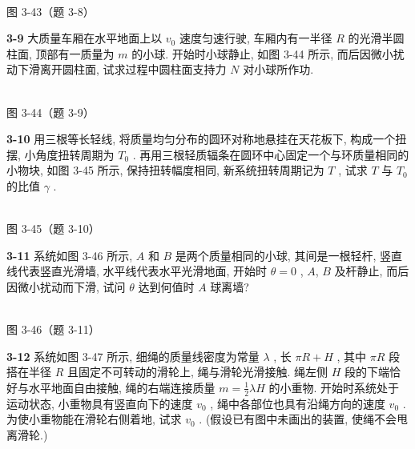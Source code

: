 \begin{center}
\resizebox{0.34\textwidth}{!}{}\\[4pt]
{\small 图 3-43（题 3-8）}
\end{center}

\newpage

\textbf{3-9} 大质量车厢在水平地面上以 $v_{0}$ 速度匀速行驶, 车厢内有一半径 $R$ 的光滑半圆柱面, 顶部有一质量为 $m$ 的小球. 开始时小球静止, 如图 3-44 所示, 而后因微小扰动下滑离开圆柱面, 试求过程中圆柱面支持力 $N$ 对小球所作功.

\begin{center}
\resizebox{0.50\textwidth}{!}{}\\[4pt]
{\small 图 3-44（题 3-9）}
\end{center}

\newpage

\textbf{3-10} 用三根等长轻线, 将质量均匀分布的圆环对称地悬挂在天花板下, 构成一个扭摆, 小角度扭转周期为 $T_{0}$ . 再用三根轻质辐条在圆环中心固定一个与环质量相同的小物块, 如图 3-45 所示, 保持扭转幅度相同, 新系统扭转周期记为 $T$ , 试求 $T$ 与 $T_{0}$ 的比值 $\gamma$ .

\begin{center}
\resizebox{0.32\textwidth}{!}{}\\[4pt]
{\small 图 3-45（题 3-10）}
\end{center}

\newpage

\textbf{3-11} 系统如图 3-46 所示, $A$ 和 $B$ 是两个质量相同的小球, 其间是一根轻杆, 竖直线代表竖直光滑墙, 水平线代表水平光滑地面, 开始时 $\theta = 0$ , $A$, $B$ 及杆静止, 而后因微小扰动而下滑, 试问 $\theta$ 达到何值时 $A$ 球离墙?

\begin{center}
\resizebox{0.37\textwidth}{!}{}\\[4pt]
{\small 图 3-46（题 3-11）}
\end{center}

\newpage

\textbf{3-12} 系统如图 3-47 所示, 细绳的质量线密度为常量 $\lambda$ , 长 $\pi R + H$ , 其中 $\pi R$ 段搭在半径 $R$ 且固定不可转动的滑轮上, 绳与滑轮光滑接触. 绳左侧 $H$ 段的下端恰好与水平地面自由接触, 绳的右端连接质量 $m = \frac{1}{2} \lambda H$ 的小重物. 开始时系统处于运动状态, 小重物具有竖直向下的速度 $v_0$ , 绳中各部位也具有沿绳方向的速度 $v_0$ . 为使小重物能在滑轮右侧着地, 试求 $v_0$ . (假设已有图中未画出的装置, 使绳不会甩离滑轮.)

